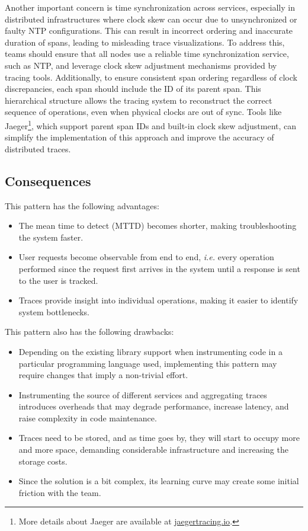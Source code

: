\documentclass[runningheads]{llncs}
\begin{document}
Another important concern is time synchronization across services, especially in distributed infrastructures where clock skew can occur due to unsynchronized or faulty NTP configurations. This can result in incorrect ordering and inaccurate duration of spans, leading to misleading trace visualizations. To address this, teams should ensure that all nodes use a reliable time synchronization service, such as NTP, and leverage clock skew adjustment mechanisms provided by tracing tools. Additionally, to ensure consistent span ordering regardless of clock discrepancies, each span should include the ID of its parent span. This hierarchical structure allows the tracing system to reconstruct the correct sequence of operations, even when physical clocks are out of sync. Tools like Jaeger\footnote{More details about Jaeger are available at \href{https://www.jaegertracing.io/}{jaegertracing.io}.}, which support parent span IDs and built-in clock skew adjustment, can simplify the implementation of this approach and improve the accuracy of distributed traces.



\subsection{Consequences}
This pattern has the following advantages:
\begin{itemize}
    \item The mean time to detect (MTTD) becomes shorter, making troubleshooting the system faster.
    \item User requests become observable from end to end, \textit{i.e.} every operation performed since the request first arrives in the system until a response is sent to the user is tracked.
    \item Traces provide insight into individual operations, making it easier to identify system bottlenecks.
\end{itemize}

\noindent This pattern also has the following drawbacks:
\begin{itemize}
    \item Depending on the existing library support when instrumenting code in a particular programming language used, implementing this pattern may require changes that imply a non-trivial effort.
    \item Instrumenting the source of different services and aggregating traces introduces overheads that may degrade performance, increase latency, and raise complexity in code maintenance.     
    \item Traces need to be stored, and as time goes by, they will start to occupy more and more space, demanding considerable infrastructure and increasing the storage costs.
    \item Since the solution is a bit complex, its learning curve may create some initial friction with the team.
\end{itemize}
\end{document}
